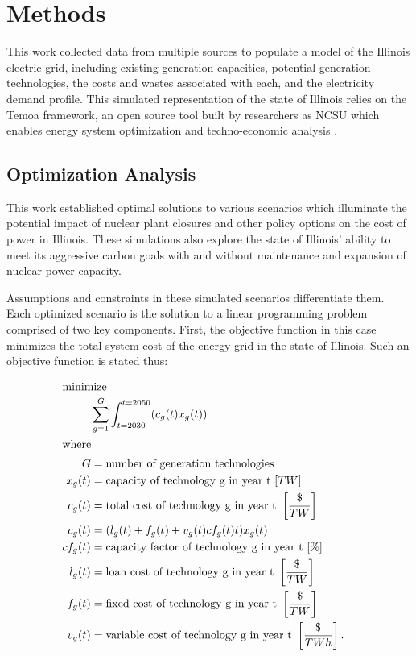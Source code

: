 \section{Methods}
This work collected data from multiple sources to populate a model of the 
Illinois electric grid, including existing generation capacities, potential 
generation technologies, the costs and wastes associated with each, and the 
electricity demand profile. This simulated representation of the state of 
Illinois relies on the Temoa framework, an open source tool built by 
researchers as \gls{NCSU} which enables energy system optimization and 
techno-economic analysis 
\cite{decarolis_temoa_2010,decarolis_modelling_2016,decarolis_formalizing_2017}.

\subsection{Optimization Analysis}
This work established optimal solutions to 
various scenarios which illuminate the potential impact of nuclear plant 
closures and other policy options on the cost of power in Illinois. These 
simulations  also explore the state of Illinois' ability to meet its aggressive 
carbon goals with and without maintenance and expansion of nuclear power 
capacity. 

Assumptions and constraints in these simulated scenarios differentiate them. 
Each optimized scenario is the solution to a linear programming 
problem  comprised of two key components. First, the objective function in this 
case minimizes the total system cost of the energy grid in the state of 
Illinois. 
Such an objective function is stated thus:

\begin{align}
\intertext{minimize} 
        &\sum_{g=1}^G\int_{t=2030}^{t=2050} (c_g(t)x_g(t))\\
\intertext{where}
        G&=\text{number of generation technologies}&\nonumber\\
        x_g(t)&=\text{capacity of technology g in year t }[TW] &\nonumber\\
        c_g(t)&=\text{total cost of technology g in year t }\left[\frac{\$}{TW}\right]&\nonumber\\
        c_g(t)&= (l_g(t) + f_g(t) + v_g(t)cf_g(t)t)x_g(t)\nonumber\\
        cf_g(t)&=\text{capacity factor of technology g in year t }[\%] &\nonumber\\
        l_g(t)&=\text{loan cost of technology g in year t }\left[\frac{\$}{TW}\right]&\nonumber\\
        f_g(t)&=\text{fixed cost of technology g in year t }\left[\frac{\$}{TW}\right]&\nonumber\\
        v_g(t)&=\text{variable cost of technology g in year t }\left[\frac{\$}{TWh}\right].&\nonumber
\end{align}

